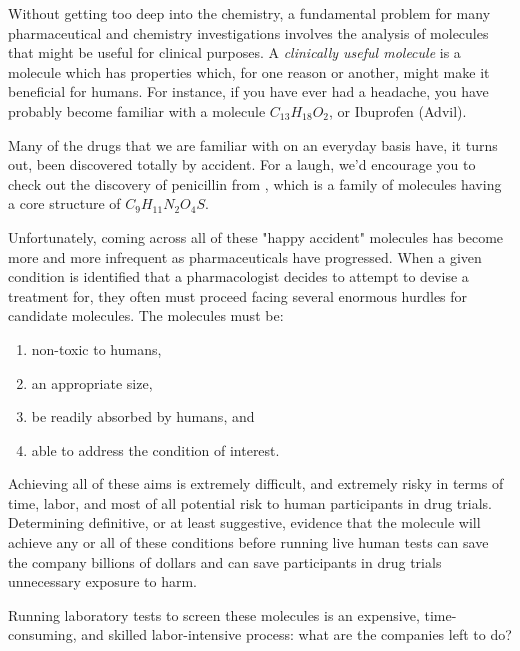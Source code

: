 Without getting too deep into the chemistry, a fundamental problem for many pharmaceutical and chemistry investigations involves the analysis of molecules that might be useful for clinical purposes. A \textit{clinically useful molecule} is a molecule which has properties which, for one reason or another, might make it beneficial for humans. For instance, if you have ever had a headache, you have probably become familiar with a molecule $C_{13}H_{18}O_2$, or Ibuprofen (Advil).

Many of the drugs that we are familiar with on an everyday basis have, it turns out, been discovered totally by accident. For a laugh, we'd encourage you to check out the discovery of penicillin from \cite{ContributorstoWikimediaprojects2023Jan}, which is a family of molecules having a core structure of $C_9H_{11}N_2O_4S$. 

Unfortunately, coming across all of these "happy accident" molecules has become more and more infrequent as pharmaceuticals have progressed. When a given condition is identified that a pharmacologist decides to attempt to devise a treatment for, they often must proceed facing several enormous hurdles for candidate molecules. The molecules must be:
\begin{enumerate}
\item non-toxic to humans,
\item an appropriate size,
\item be readily absorbed by humans, and
\item able to address the condition of interest.
\end{enumerate}

Achieving all of these aims is extremely difficult, and extremely risky in terms of time, labor, and most of all potential risk to human participants in drug trials. Determining definitive, or at least suggestive, evidence that the molecule will achieve any or all of these conditions before running live human tests can save the company billions of dollars and can save participants in drug trials unnecessary exposure to harm.

Running laboratory tests to screen these molecules is an expensive, time-consuming, and skilled labor-intensive process: what are the companies left to do?

